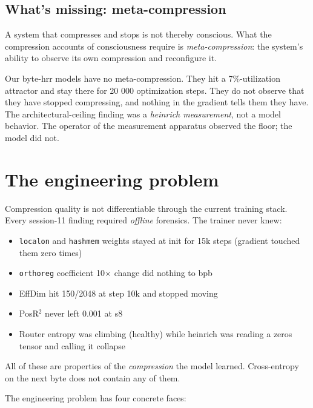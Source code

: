 \documentclass[11pt,openany]{book}
\begin{document}
\section{What's missing: meta-compression}

A system that compresses and stops is not thereby conscious. What the
compression accounts of consciousness require is
\emph{meta-compression}: the system's ability to observe its own
compression and reconfigure it.

Our byte-hrr models have no meta-compression. They hit a
7\%-utilization attractor and stay there for 20 000 optimization
steps. They do not observe that they have stopped compressing, and
nothing in the gradient tells them they have. The
architectural-ceiling finding was a \emph{heinrich measurement}, not
a model behavior. The operator of the measurement apparatus observed
the floor; the model did not.

\chapter{The engineering problem}
\label{chap:engineering}

Compression quality is not differentiable through the current training
stack. Every session-11 finding required \emph{offline} forensics.
The trainer never knew:

\begin{itemize}
  \item \texttt{localon} and \texttt{hashmem} weights stayed at init
  for 15k steps (gradient touched them zero times)
  \item \texttt{orthoreg} coefficient 10$\times$ change did nothing
  to bpb
  \item EffDim hit 150/2048 at step 10k and stopped moving
  \item PosR$^2$ never left 0.001 at s8
  \item Router entropy was climbing (healthy) while heinrich was
  reading a zeros tensor and calling it collapse
\end{itemize}

All of these are properties of the \emph{compression} the model
learned. Cross-entropy on the next byte does not contain any of them.

The engineering problem has four concrete faces:
\end{document}
